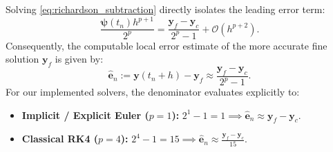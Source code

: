 Solving \eqref{eq:richardson_subtraction} directly isolates the leading error term:
\begin{equation}
\label{eq:principal_error_isolated}
\frac{\boldsymbol{\psi}(t_n) h^{p+1}}{2^p} = \frac{\mathbf{y}_f - \mathbf{y}_c}{2^p - 1} + \mathcal{O}(h^{p+2}).
\end{equation}
Consequently, the computable local error estimate of the more accurate fine solution $\mathbf{y}_f$ is given by:
\begin{equation}
\label{eq:local_error_estimator}
\hat{\mathbf{e}}_n := \mathbf{y}(t_n + h) - \mathbf{y}_f \approx \frac{\mathbf{y}_f - \mathbf{y}_c}{2^p - 1}.
\end{equation}
For our implemented solvers, the denominator evaluates explicitly to:
\begin{itemize}
    \item \textbf{Implicit / Explicit Euler ($p=1$):} $2^1 - 1 = 1 \implies \hat{\mathbf{e}}_n \approx \mathbf{y}_f - \mathbf{y}_c$.
    \item \textbf{Classical RK4 ($p=4$):} $2^4 - 1 = 15 \implies \hat{\mathbf{e}}_n \approx \frac{\mathbf{y}_f - \mathbf{y}_c}{15}$.
\end{itemize}

